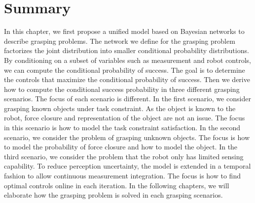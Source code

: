 \section{Summary}
 In this chapter, we first propose a unified model based on Bayesian networks to describe grasping problems. The network we define for the grasping problem factorizes the joint distribution into smaller conditional probability distributions. By conditioning on a subset of variables such as measurement and robot controls, we can compute the conditional probability of success. The goal is to determine the controls that maximize the conditional probability of success. Then we derive how to compute the conditional success probability in three different grasping scenarios. The focus of each scenario is different. In the first scenario, we consider grasping known objects under task constraint. As the object is known to the robot, force closure and representation of the object are not an issue. The focus in this scenario is how to model the task constraint satisfaction. In the second scenario, we consider the problem of grasping unknown objects. The focus is how to model the probability of force closure and how to model the object. In the third scenario, we consider the problem that the robot only has limited sensing capability. To reduce perception uncertainty, the model is extended in a temporal fashion to allow continuous measurement integration. The focus is how to find optimal controls online in each iteration. In the following chapters, we will elaborate how the grasping problem is solved in each grasping scenarios.




 
